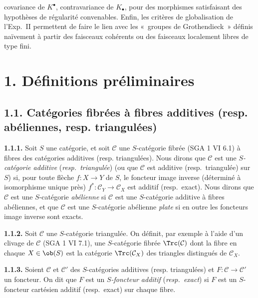 covariance de \(K^\bullet\), contravariance de \(K_\bullet\), pour des morphismes satisfaisant des hypothèses de régularité convenables. Enfin, les critères de globalisation de l'Exp.\ II permettent de faire le lien avec les «~groupes de Grothendieck~» définis naïvement à partir des faisceaux cohérents ou des faisceaux localement libres de type fini.

\section*{1. Définitions préliminaires}

\subsection*{1.1. Catégories fibrées à fibres additives (resp. abéliennes, resp. triangulées)}

\textbf{1.1.1.} Soit \(S\) une catégorie, et soit \(\mathcal C\) une \(S\)-catégorie fibrée (SGA 1 VI 6.1) à fibres des catégories additives (resp. triangulées). Nous dirons que \(\mathcal C\) est une \emph{\(S\)-catégorie additive} (\emph{resp.\ triangulée}) (ou que \(\mathcal C\) est additive (resp.\ triangulée) sur \(S\)) si, pour toute flèche \(f:X\to Y\) de \(S\), le foncteur image inverse (déterminé à isomorphisme unique près) \(f^*:\mathcal C_Y\longrightarrow \mathcal C_X\) est additif (resp.\ exact). Nous dirons que \(\mathcal C\) est une \(S\)-catégorie \emph{abélienne} si \(\mathcal C\) est une \(S\)-catégorie additive à fibres abéliennes, et que \(\mathcal C\) est une \(S\)-catégorie abélienne \emph{plate} si en outre les foncteurs image inverse sont exacts.

\textbf{1.1.2.} Soit \(\mathcal C\) une \(S\)-catégorie triangulée. On définit, par exemple à l'aide d'un clivage de \(\mathcal C\) (SGA 1 VI 7.1), une \(S\)-catégorie fibrée \(\Trc(\mathcal C)\) dont la fibre en chaque \(X\in \ob(S)\) est la catégorie \(\Trc(\mathcal C_X)\) des triangles distingués de \(\mathcal C_X\).

\textbf{1.1.3.} Soient \(\mathcal C\) et \(\mathcal C'\) des \(S\)-catégories additives (resp. triangulées) et \(F:\mathcal C\to\mathcal C'\) un foncteur. On dit que \(F\) est un \emph{\(S\)-foncteur additif} (\emph{resp.\ exact}) si \(F\) est un \(S\)-foncteur cartésien additif (resp.\ exact) sur chaque fibre.



\providecommand{\cC}{\mathcal C}
\providecommand{\cD}{\mathcal D}
\providecommand{\cK}{\mathcal K}
\providecommand{\cO}{\mathcal O}
\providecommand{\cS}{\mathcal S}
\providecommand{\Cpx}{\mathrm C}
\providecommand{\Kpx}{\mathrm K}
\providecommand{\Dpx}{\mathrm D}
\providecommand{\D}{\mathrm D}
\providecommand{\Ho}{\mathrm H}
\providecommand{\RHom}{\mathrm R\!\operatorname{Hom}}
\providecommand{\Ob}{\operatorname{ob}}
\providecommand{\Coker}{\operatorname{Coker}}
\providecommand{\Ker}{\operatorname{Ker}}
\providecommand{\Im}{\operatorname{Im}}
\providecommand{\Hom}{\operatorname{Hom}}
\providecommand{\Cone}{\operatorname{Cone}}
\providecommand{\id}{\operatorname{Id}}
\providecommand{\qis}{\xrightarrow{\sim}}


